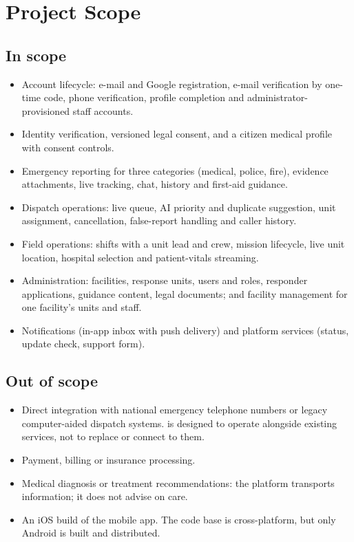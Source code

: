 \section{Project Scope}

\subsection*{In scope}
\begin{itemize}
  \item Account lifecycle: e-mail and Google registration, e-mail verification by one-time code, phone verification,
        profile completion and administrator-provisioned staff accounts.
  \item Identity verification, versioned legal consent, and a citizen medical profile with consent controls.
  \item Emergency reporting for three categories (medical, police, fire), evidence attachments, live tracking,
        chat, history and first-aid guidance.
  \item Dispatch operations: live queue, AI priority and duplicate suggestion, unit assignment, cancellation,
        false-report handling and caller history.
  \item Field operations: shifts with a unit lead and crew, mission lifecycle, live unit location, hospital
        selection and patient-vitals streaming.
  \item Administration: facilities, response units, users and roles, responder applications, guidance content, legal
        documents; and facility management for one facility's units and staff.
  \item Notifications (in-app inbox with push delivery) and platform services (status, update check, support form).
\end{itemize}

\subsection*{Out of scope}
\begin{itemize}
  \item Direct integration with national emergency telephone numbers or legacy computer-aided dispatch systems.
        \ProjectName{} is designed to operate alongside existing services, not to replace or connect to them.
  \item Payment, billing or insurance processing.
  \item Medical diagnosis or treatment recommendations: the platform transports information; it does not advise on care.
  \item An iOS build of the mobile app. The code base is cross-platform, but only Android is built and distributed.
\end{itemize}

